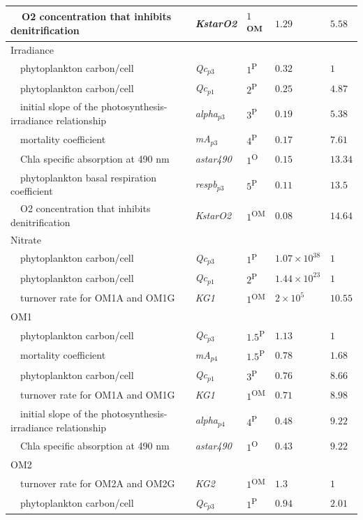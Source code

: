 \documentclass[letterpaper,12pt,oneside]{article}\usepackage[]{graphicx}\usepackage[]{color}
\begin{document}
\begin{table}[!tbp]
{\begin{center}
\begin{tabular}{lllll}
~~\scriptsize{O2 concentration that inhibits denitrification}&\scriptsize{\textit{KstarO2}}&$1$\textsuperscript{OM}&$1.29$&$5.58$\tabularnewline
\hline
{Irradiance}&&&&\tabularnewline
~~\scriptsize{phytoplankton carbon/cell}&\scriptsize{\textit{Qc$_{p3}$}}&$1$\textsuperscript{P}&$0.32$&$1$\tabularnewline
~~\scriptsize{phytoplankton carbon/cell}&\scriptsize{\textit{Qc$_{p1}$}}&$2$\textsuperscript{P}&$0.25$&$4.87$\tabularnewline
~~\scriptsize{initial slope of the photosynthesis-irradiance relationship}&\scriptsize{\textit{alpha$_{p3}$}}&$3$\textsuperscript{P}&$0.19$&$5.38$\tabularnewline
~~\scriptsize{mortality coefficient}&\scriptsize{\textit{mA$_{p3}$}}&$4$\textsuperscript{P}&$0.17$&$7.61$\tabularnewline
~~\scriptsize{Chla specific absorption at 490 nm}&\scriptsize{\textit{astar490}}&$1$\textsuperscript{O}&$0.15$&$13.34$\tabularnewline
~~\scriptsize{phytoplankton basal respiration coefficient}&\scriptsize{\textit{respb$_{p3}$}}&$5$\textsuperscript{P}&$0.11$&$13.5$\tabularnewline
~~\scriptsize{O2 concentration that inhibits denitrification}&\scriptsize{\textit{KstarO2}}&$1$\textsuperscript{OM}&$0.08$&$14.64$\tabularnewline
\hline
{Nitrate}&&&&\tabularnewline
~~\scriptsize{phytoplankton carbon/cell}&\scriptsize{\textit{Qc$_{p3}$}}&$1$\textsuperscript{P}&$1.07\times 10^{38}$&$1$\tabularnewline
~~\scriptsize{phytoplankton carbon/cell}&\scriptsize{\textit{Qc$_{p1}$}}&$2$\textsuperscript{P}&$1.44\times 10^{23}$&$1$\tabularnewline
~~\scriptsize{turnover rate for OM1A and OM1G}&\scriptsize{\textit{KG1}}&$1$\textsuperscript{OM}&$2\times 10^{5}$&$10.55$\tabularnewline
\hline
{OM1}&&&&\tabularnewline
~~\scriptsize{phytoplankton carbon/cell}&\scriptsize{\textit{Qc$_{p3}$}}&$1.5$\textsuperscript{P}&$1.13$&$1$\tabularnewline
~~\scriptsize{mortality coefficient}&\scriptsize{\textit{mA$_{p4}$}}&$1.5$\textsuperscript{P}&$0.78$&$1.68$\tabularnewline
~~\scriptsize{phytoplankton carbon/cell}&\scriptsize{\textit{Qc$_{p1}$}}&$3$\textsuperscript{P}&$0.76$&$8.66$\tabularnewline
~~\scriptsize{turnover rate for OM1A and OM1G}&\scriptsize{\textit{KG1}}&$1$\textsuperscript{OM}&$0.71$&$8.98$\tabularnewline
~~\scriptsize{initial slope of the photosynthesis-irradiance relationship}&\scriptsize{\textit{alpha$_{p4}$}}&$4$\textsuperscript{P}&$0.48$&$9.22$\tabularnewline
~~\scriptsize{Chla specific absorption at 490 nm}&\scriptsize{\textit{astar490}}&$1$\textsuperscript{O}&$0.43$&$9.22$\tabularnewline
\hline
{OM2}&&&&\tabularnewline
~~\scriptsize{turnover rate for OM2A and OM2G}&\scriptsize{\textit{KG2}}&$1$\textsuperscript{OM}&$1.3$&$1$\tabularnewline
~~\scriptsize{phytoplankton carbon/cell}&\scriptsize{\textit{Qc$_{p3}$}}&$1$\textsuperscript{P}&$0.94$&$2.01$\tabularnewline

\end{tabular}
\end{center}}
\end{table}
\end{document}
